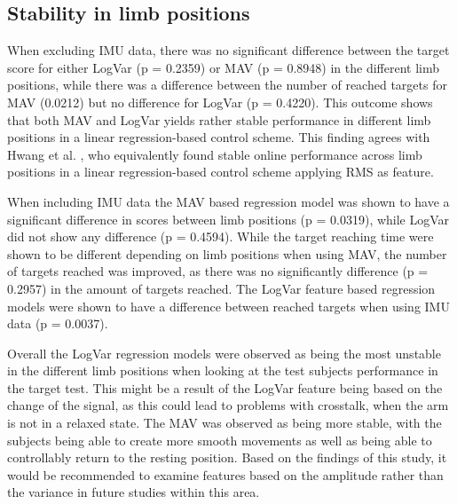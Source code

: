 \subsection{Stability in limb positions}
When excluding IMU data, there was no significant difference between the target score for either LogVar (p = 0.2359) or MAV (p = 0.8948) in the different limb positions, while there was a difference between the number of reached targets for MAV (0.0212) but no difference for LogVar (p = 0.4220). This outcome shows that both MAV and LogVar yields rather stable performance in different limb positions in a linear regression-based control scheme. This finding agrees with Hwang et al. \cite{Hwang2017}, who equivalently found stable online performance across limb positions in a linear regression-based control scheme applying RMS as feature.

When including IMU data the MAV based regression model was shown to have a significant difference in scores between limb positions (p = 0.0319), while LogVar did not show any difference (p = 0.4594). While the target reaching time were shown to be different depending on limb positions when using MAV, the number of targets reached was improved, as there was no significantly difference (p = 0.2957) in the amount of targets reached. The LogVar feature based regression models were shown to have a difference between reached targets when using IMU data (p = 0.0037).

Overall the LogVar regression models were observed as being the most unstable in the different limb positions when looking at the test subjects performance in the target test. This might be a result of the LogVar feature being based on the change of the signal, as this could lead to problems with crosstalk, when the arm is not in a relaxed state. The MAV was observed as being more stable, with the subjects being able to create more smooth movements as well as being able to controllably return to the resting position. Based on the findings of this study, it would be recommended to examine features based on the amplitude rather than the variance in future studies within this area.


